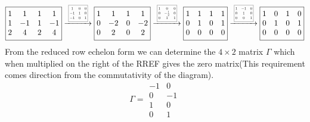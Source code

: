 \documentclass[12pt]{amsart}
\theoremstyle{definition}
\newcommand{\R}{\mathbb{R}}
\DeclareMathOperator{\kernel}{\mathrm{ker}}
\begin{document}
\begin{enumerate}[start=0]
$$\boxed{\begin{matrix}
1 & 1 & 1 & 1\\
1 & -1 & 1 & -1 \\
2 & 4 & 2 & 4
\end{matrix}}
\xrightarrow{\scalebox{0.5}{\;
\boxed{\begin{matrix}
    1 &0& 0\\
    -1& 1 & 0\\
    -1 & 0 & 1
\end{matrix}}\;}}
\boxed{\begin{matrix}
1 & 1 & 1 & 1\\
0 & -2 & 0 & -2 \\
0 & 2 & 0 & 2
\end{matrix}}
\xrightarrow{\scalebox{0.5}{\;
\boxed{\begin{matrix}
    1 &0& 0\\
    0& -\frac{1}{2} & 0\\
    0 & 1 & 1
\end{matrix}}\;}}
\boxed{\begin{matrix}
1 & 1 & 1 & 1\\
0 & 1 & 0 & 1 \\
0 & 0 & 0 & 0
\end{matrix}}
\xrightarrow{\scalebox{0.5}{\;
\boxed{\begin{matrix}
    1 &-1& 0\\
    0& 1 & 0\\
    0 & 0 & 1
\end{matrix}}\;}}
\boxed{\begin{matrix}
1 & 0 & 1 & 0\\
0 & 1 & 0 & 1 \\
0 & 0 & 0 & 0
\end{matrix}}$$
From the reduced row echelon form we can determine the $4\times 2$ matrix $\Gamma$ which when multiplied on the right of the RREF gives the zero matrix(This requirement comes direction from the commutativity of the diagram).
$$\Gamma=\boxed{\begin{matrix}
-1 & 0\\
0 & -1\\
1 & 0\\
0 & 1

\end{matrix}}$$\\


\end{enumerate}
\end{document}
